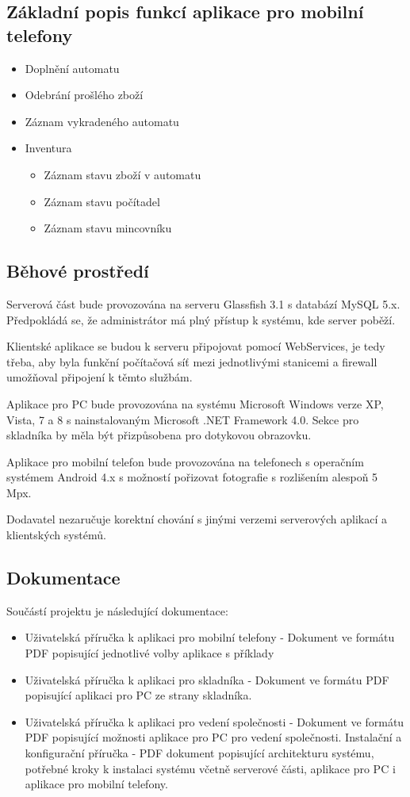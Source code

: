 \documentclass[a4paper,10pt]{article}
\begin{document}
\subsection{Základní popis funkcí aplikace pro mobilní telefony}

\begin{itemize}
  \item Doplnění automatu
  \item Odebrání prošlého zboží
  \item Záznam vykradeného automatu
  \item Inventura
  \begin{itemize}
  	\item Záznam stavu zboží v automatu
  	\item Záznam stavu počítadel
  	\item Záznam stavu mincovníku
  \end{itemize}
\end{itemize}

\subsection{Běhové prostředí}
Serverová část bude provozována na serveru Glassfish 3.1 s databází MySQL 5.x. Předpokládá se, že administrátor má plný přístup k systému, kde server poběží.

Klientské aplikace se budou k serveru připojovat pomocí WebServices, je tedy třeba, aby byla funkční počítačová síť mezi jednotlivými stanicemi a firewall umožňoval připojení k těmto službám.

Aplikace pro PC bude provozována na systému Microsoft Windows verze XP, Vista, 7 a 8 s nainstalovaným Microsoft .NET Framework 4.0. Sekce pro skladníka by měla být přizpůsobena pro dotykovou obrazovku.

Aplikace pro mobilní telefon bude provozována na telefonech s operačním systémem Android 4.x s možností pořizovat fotografie s rozlišením alespoň 5 Mpx.

Dodavatel nezaručuje korektní chování s jinými verzemi serverových aplikací a
klientských systémů.

\subsection{Dokumentace}
Součástí projektu je následující dokumentace:
\begin{itemize}
	\item Uživatelská příručka k aplikaci pro mobilní telefony - Dokument ve formátu PDF popisující jednotlivé volby aplikace s příklady
	\item Uživatelská příručka k aplikaci pro skladníka - Dokument ve formátu PDF popisující aplikaci pro PC ze strany skladníka. 
	\item Uživatelská příručka k aplikaci pro vedení společnosti - Dokument ve formátu PDF popisující možnosti aplikace pro PC pro vedení společnosti.
	Instalační a konfigurační příručka - PDF dokument popisující architekturu systému, potřebné kroky k instalaci systému včetně serverové části, aplikace pro PC i aplikace pro mobilní telefony.
\end{itemize}
\end{document}
